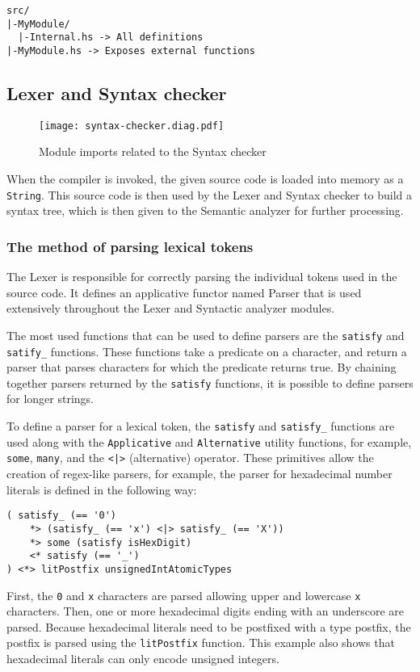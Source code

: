 \documentclass[12pt]{article}
\begin{document}
\lstset{numbers=none}
\begin{lstlisting}
src/
|-MyModule/
  |-Internal.hs -> All definitions
|-MyModule.hs -> Exposes external functions
\end{lstlisting}

\subsection{Lexer and Syntax checker}

\begin{figure}[t]
\texttt{[image: syntax-checker.diag.pdf]}
\centering
\caption{Module imports related to the Syntax checker}
\end{figure}

When the compiler is invoked, the given source code is loaded into memory as a
\verb$String$. This source code is then used by the Lexer and
Syntax checker to build a syntax tree, which is then given to the
Semantic analyzer for further processing.

\subsubsection{The method of parsing lexical tokens}

The Lexer is responsible for correctly parsing the individual tokens used in the
source code. It defines an applicative functor named Parser that is used
extensively throughout the Lexer and Syntactic analyzer modules. 

The most used functions that can be used to define parsers are the
\verb$satisfy$ and \verb$satify_$ functions. These functions take a predicate on
a character, and return a parser that parses characters for which the predicate
returns true. By chaining together parsers returned by the \verb$satisfy$
functions, it is possible to define parsers for longer strings.

To define a parser for a lexical token, the \verb$satisfy$ and \verb$satisfy_$
functions are used along with the \verb$Applicative$ and \verb$Alternative$
utility functions, for example, \verb$some$, \verb$many$, and the \verb$<|>$
(alternative) operator. These primitives allow the creation of regex-like
parsers, for example, the parser for hexadecimal number literals is defined in
the following way:
\\\noindent\begin{minipage}{\textwidth}
\begin{lstlisting}
( satisfy_ (== '0')
    *> (satisfy_ (== 'x') <|> satisfy_ (== 'X'))
    *> some (satisfy isHexDigit)
    <* satisfy (== '_')
) <*> litPostfix unsignedIntAtomicTypes
\end{lstlisting}
\end{minipage}
First, the \verb$0$ and \verb$x$ characters are parsed allowing upper and
lowercase \verb$x$ characters. Then, one or more hexadecimal digits ending with
an underscore are parsed. Because hexadecimal literals need to be postfixed with
a type postfix, the postfix is parsed using the \verb$litPostfix$ function. This
example also shows that hexadecimal literals can only encode unsigned integers.
\end{document}
